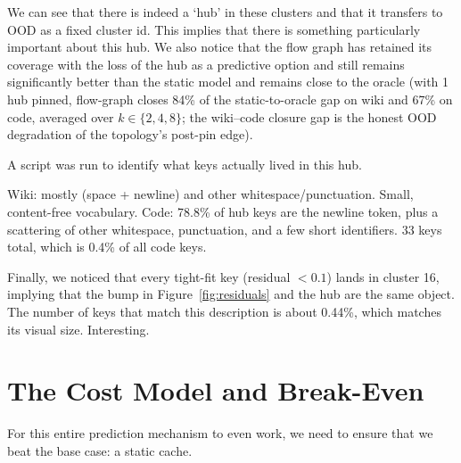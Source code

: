 \documentclass[11pt,a4paper]{article}
\begin{document}
We can see that there is indeed a `hub' in these clusters and that it transfers to OOD as a fixed cluster id. This implies that there is something particularly important about this hub. We also notice that the flow graph has retained its coverage with the loss of the hub as a predictive option and still remains significantly better than the static model and remains close to the oracle (with 1 hub pinned, flow-graph closes 84\% of the static-to-oracle gap on wiki and 67\% on code, averaged over $k \in \{2,4,8\}$; the wiki--code closure gap is the honest OOD degradation of the topology's post-pin edge).

A script was run to identify what keys actually lived in this hub.

Wiki: mostly (space + newline) and other whitespace/punctuation. Small, content-free vocabulary.
Code: 78.8\% of hub keys are the newline token, plus a scattering of other whitespace, punctuation, and a few short identifiers. 33 keys total, which is 0.4\% of all code keys.

Finally, we noticed that every tight-fit key (residual $< 0.1$) lands in cluster 16, implying that the bump in Figure~\ref{fig:residuals} and the hub are the same object. The number of keys that match this description is about 0.44\%, which matches its visual size. Interesting.



\section{The Cost Model and Break-Even}\label{sec:breakeven}

For this entire prediction mechanism to even work, we need to ensure that we beat the base case: a static cache.
\end{document}
